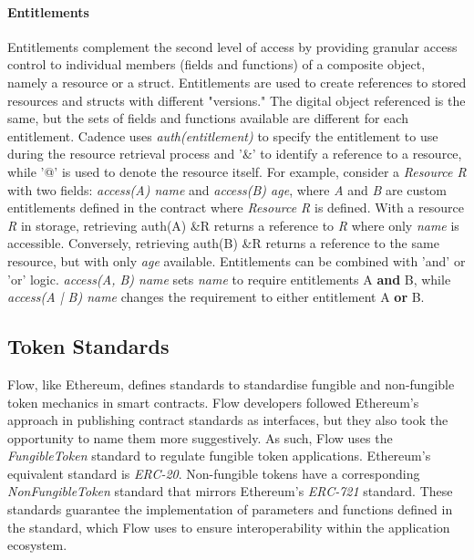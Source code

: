 \documentclass[../NFTComp_IEEE.tex]{subfiles}
\begin{document}
\paragraph{Entitlements}
Entitlements complement the second level of access by providing granular access control to individual members (fields and functions) of a composite object, namely a resource or a struct. Entitlements are used to create references to stored resources and structs with different "versions." The digital object referenced is the same, but the sets of fields and functions available are different for each entitlement. Cadence uses \textit{auth(entitlement)} to specify the entitlement to use during the resource retrieval process and '\&' to identify a reference to a resource, while '@' is used to denote the resource itself. For example, consider a \textit{Resource R} with two fields: \textit{access(A) name} and \textit{access(B) age}, where \textit{A} and \textit{B} are custom entitlements defined in the contract where \textit{Resource R} is defined. With a resource \textit{R} in storage, retrieving auth(A) \&R returns a reference to \textit{R} where only \textit{name} is accessible. Conversely, retrieving auth(B) \&R returns a reference to the same resource, but with only \textit{age} available. Entitlements can be combined with 'and' or 'or' logic. \textit{access(A, B) name} sets \textit{name} to require entitlements A \textbf{and} B, while \textit{access(A | B) name} changes the requirement to either entitlement A \textbf{or} B.

\subsection{Token Standards}
Flow, like Ethereum, defines standards to standardise fungible and non-fungible token mechanics in smart contracts. Flow developers followed Ethereum's approach in publishing contract standards as interfaces, but they also took the opportunity to name them more suggestively. As such, Flow uses the \textit{FungibleToken} standard \cite{Dapper2022c} to regulate fungible token applications. Ethereum's equivalent standard is \textit{ERC-20}. Non-fungible tokens have a corresponding \textit{NonFungibleToken} standard \cite{Dapper2022d} that mirrors Ethereum's \textit{ERC-721} standard. These standards guarantee the implementation of parameters and functions defined in the standard, which Flow uses to ensure interoperability within the application ecosystem.
\end{document}
